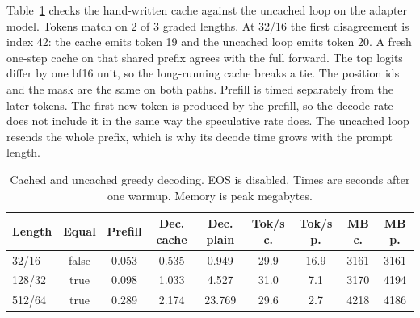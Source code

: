 \begin{table}[t]
\centering
\caption{Reviewed test failures for the adapter. The full quotations are in \texttt{results/task2/errors.md}.}
\label{tab:errors}
\end{table}

Table~\ref{tab:kv} checks the hand-written cache against the uncached loop on the adapter model.
Tokens match on 2 of 3 graded lengths. At 32/16 the first disagreement is index 42: the cache emits token 19 and the uncached loop emits token 20. A fresh one-step cache on that shared prefix agrees with the full forward. The top logits differ by one bf16 unit, so the long-running cache breaks a tie. The position ids and the mask are the same on both paths.
Prefill is timed separately from the later tokens.
The first new token is produced by the prefill, so the decode rate does not include it in the same way the speculative rate does.
The uncached loop resends the whole prefix, which is why its decode time grows with the prompt length.

\begin{table}[t]
\centering
\caption{Cached and uncached greedy decoding. EOS is disabled. Times are seconds after one warmup. Memory is peak megabytes.}
\label{tab:kv}
\begin{tabular}{lcccccccc}
\toprule
Length & Equal & Prefill & Dec. cache & Dec. plain & Tok/s c. & Tok/s p. & MB c. & MB p. \\
\midrule
32/16 & false & 0.053 & 0.535 & 0.949 & 29.9 & 16.9 & 3161 & 3161 \\
128/32 & true & 0.098 & 1.033 & 4.527 & 31.0 & 7.1 & 3170 & 4194 \\
512/64 & true & 0.289 & 2.174 & 23.769 & 29.6 & 2.7 & 4218 & 4186 \\
\bottomrule
\end{tabular}
\end{table}

